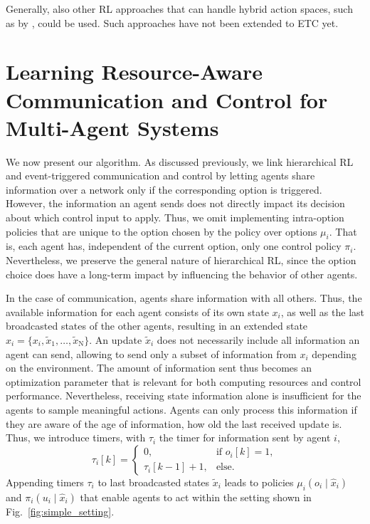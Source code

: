 \documentclass[12pt, final]{l4dc2023}
\begin{document}
\begin{remark}
Generally, also other RL approaches that can handle hybrid action spaces, such as by \cite{neunert2020continuousdiscrete}, could be used. Such approaches have not been extended to ETC yet.
\end{remark}

\section{Learning Resource-Aware Communication and Control for Multi-Agent Systems}

We now present our algorithm.
As discussed previously, we link hierarchical RL and event-triggered communication and control by letting agents share information over a network only if the corresponding option is triggered.
However, the information an agent sends does not directly impact its decision about which control input to apply.
Thus, we omit implementing intra-option policies that are unique to the option chosen by the policy over options $\mu_i$. 
That is, each agent has, independent of the current option, only one control policy $\pi_i$.
Nevertheless, we preserve the general nature of hierarchical RL, since the option choice does have a long-term impact by influencing the behavior of other agents.

In the case of communication, agents share information with all others.
Thus, the available information for each agent consists of its own state $x_i$, as well as the last broadcasted states of the other agents, resulting in an extended state $\hat{x}_{i} = \{x_i, \tilde{x}_1, \dots, \tilde{x}_\mathrm{N}\}$.
An update $\tilde{x}_i$ does not necessarily include all information an agent can send, allowing to send only a subset of information from $x_i$ depending on the environment. The amount of information sent thus becomes an optimization parameter that is relevant for both computing resources and control performance. Nevertheless, receiving state information alone is insufficient for the agents to sample meaningful actions. Agents can only process this information if they are aware of the age of information, \ie how old the last received update is. Thus, we introduce timers, with $\tau_i$ the timer for information sent by agent $i$,
\begin{equation}
    \tau_i\left[k\right]=
        \begin{cases}
        0, & \text{if } o_i[k]=1, \\
        \tau_i\left[k-1\right]+1, & \text{else}.
        \end{cases}
        \label{eq:timer}
\end{equation}
Appending timers $\tau_i$ to last broadcasted states $\tilde{x}_i$ leads to policies $\mu_{i}(o_{i}\mid\hat{x}_{i})$ and $\pi_{i}(u_{i}\mid\hat{x}_{i})$ that enable agents to act within the setting shown in Fig.~\ref{fig:simple_setting}. 
\end{document}
